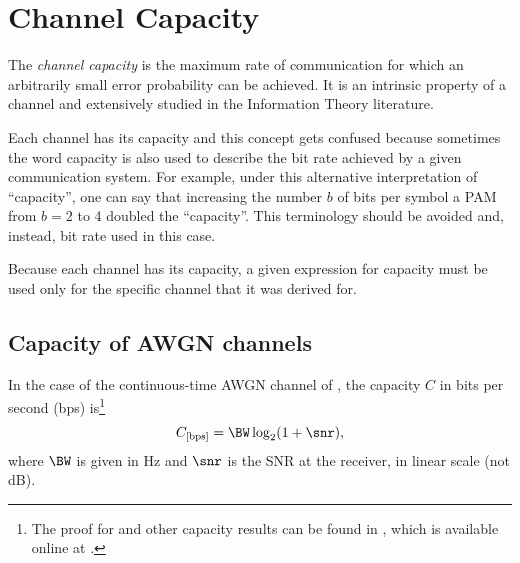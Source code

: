 \section{Channel Capacity}
%
The \emph{channel capacity} is the maximum rate of communication for which an arbitrarily small error probability can be achieved. It is an intrinsic property of a channel and extensively studied in the Information Theory literature. 
%

Each channel has its capacity and this concept gets confused because sometimes the word capacity is also used to describe the bit rate achieved by a given communication system. For example, under this alternative interpretation of ``capacity'', one can say that increasing the number $b$ of bits per symbol a PAM from $b=2$ to 4 doubled the ``capacity''. This terminology should be avoided and, instead, bit rate used in this case.

Because each channel has its capacity, a given expression for capacity must be used only for the specific channel that it was derived for. 

\subsection{Capacity of AWGN channels}

In the case of the continuous-time AWGN channel of , the capacity $C$ in bits per second (bps) is\footnote{The proof for  and other capacity results can be found in \cite{Tse05}, which is available online at .}
%
\begin{equation}
C_{[\textrm{bps}]} = \BW \log_2 (1 + \snr),
\label{eq:awgnChannelCapacity}
\end{equation}
where $\BW$ is given in Hz and $\snr$ is the SNR at the receiver, in linear scale (not dB).

